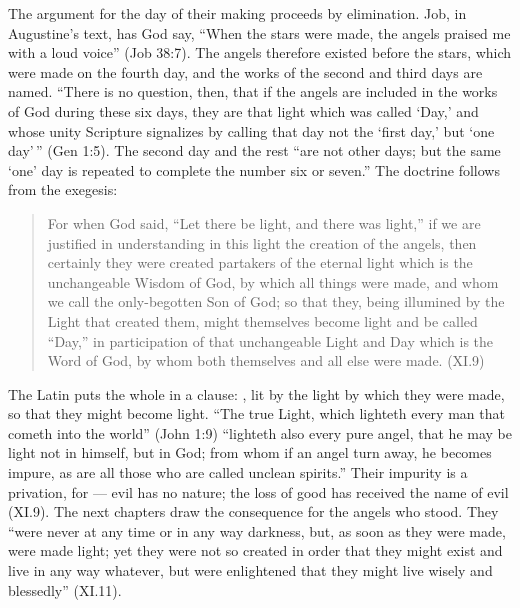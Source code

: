 The argument for the day of their making proceeds by elimination. Job, in
Augustine's text, has God say, ``When the stars were made, the angels
praised me with a loud voice'' (Job 38:7). The angels therefore existed
before the stars, which were made on the fourth day, and the works of the
second and third days are named. ``There is no question, then, that
if the angels are included in the works of God during these six days, they
are that light which was called `Day,' and whose unity Scripture signalizes
by calling that day not the `first day,' but `one day'\,'' (Gen 1:5). The
second day and the rest ``are not other days; but the same `one' day is
repeated to complete the number six or seven.'' The doctrine follows from
the exegesis:
\begin{quote}
For when God said, ``Let there be light, and there was light,'' if we are
justified in understanding in this light the creation of the angels, then
certainly they were created partakers of the eternal light which is the
unchangeable Wisdom of God, by which all things were made, and whom we call
the only-begotten Son of God; so that they, being illumined by the Light
that created them, might themselves become light and be called ``Day,'' in
participation of that unchangeable Light and Day which is the Word of God,
by whom both themselves and all else were made. (XI.9)
\end{quote}
The Latin puts the whole in a clause: , lit by the light by which they were made, so that
they might become light. ``The true Light, which lighteth every man that
cometh into the world'' (John 1:9) ``lighteth also every pure angel, that
he may be light not in himself, but in God; from whom if an angel turn
away, he becomes impure, as are all those who are called unclean
spirits.'' Their impurity is a privation, for  --- evil has no nature;
the loss of good has received the name of evil (XI.9). The next chapters
draw the consequence for the angels who stood. They ``were never at any
time or in any way darkness, but, as soon as they were made, were made
light; yet they were not so created in order that they might exist and
live in any way whatever, but were enlightened that they might live wisely
and blessedly'' (XI.11).

